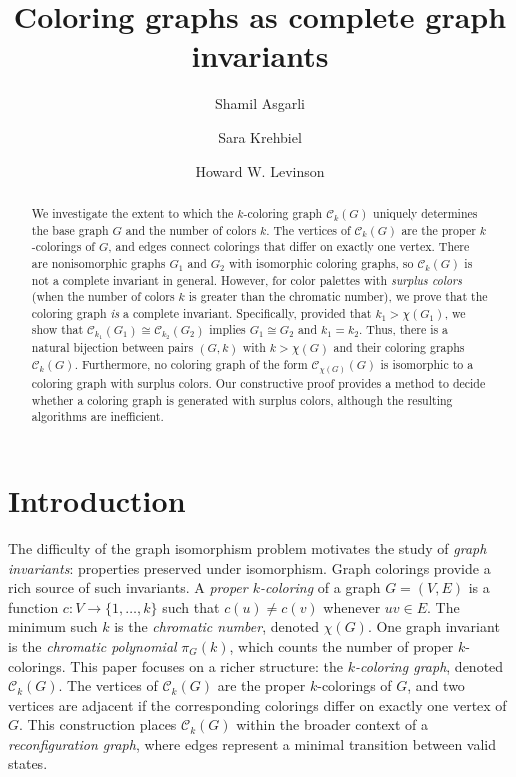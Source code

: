 \documentclass{amsart}
\title
{Coloring graphs as complete graph invariants}
\author{Shamil Asgarli}
\author{Sara Krehbiel}
\author{Howard W. Levinson}
\theoremstyle{hypothesisstyle}
\theoremstyle{definition}
\theoremstyle{remark}
\numberwithin{equation}{section}
\newcommand{\C}{\mathcal C}
\begin{document}
\begin{abstract} We investigate the extent to which the $k$-coloring graph $\mathcal{C}_{k}(G)$ uniquely determines the base graph $G$ and the number of colors $k$. The vertices of $\mathcal{C}_{k}(G)$ are the proper $k$-colorings of $G$, and edges connect colorings that differ on exactly one vertex. There are nonisomorphic graphs $G_1$ and $G_2$ with isomorphic coloring graphs, so $\mathcal{C}_{k}(G)$ is not a complete invariant in general. However, for color palettes with \emph{surplus colors} (when the number of colors $k$ is greater than the chromatic number), we prove that the coloring graph \textit{is} a complete invariant. Specifically, provided that $k_1 > \chi(G_1)$, we show that $\mathcal{C}_{k_1}(G_1)\cong \mathcal{C}_{k_2}(G_2)$ implies $G_1\cong G_2$ and $k_1=k_2$. Thus, there is a natural bijection between pairs $(G, k)$ with $k > \chi(G)$ and their coloring graphs $\mathcal{C}_k(G)$. Furthermore, no coloring graph of the form $\mathcal{C}_{\chi(G)}(G)$ is isomorphic to a coloring graph with surplus colors. Our constructive proof provides a method to decide whether a coloring graph is generated with surplus colors, although the resulting algorithms are inefficient.
\end{abstract}

\maketitle

\section{Introduction}

The difficulty of the graph isomorphism problem motivates the study of \emph{graph invariants}: properties preserved under isomorphism. Graph colorings provide a rich source of such invariants. A \emph{proper $k$-coloring} of a graph $G=(V, E)$ is a function $c\colon V \to \{1, \dots, k\}$ such that $c(u) \neq c(v)$ whenever $uv \in E$.  The minimum such $k$ is the \emph{chromatic number}, denoted $\chi(G)$. One graph invariant is the \emph{chromatic polynomial} $\pi_G(k)$, which counts the number of proper $k$-colorings. This paper focuses on a richer structure: the \emph{$k$-coloring graph}, denoted $\C_k(G)$. The vertices of $\C_k(G)$ are the proper $k$-colorings of $G$, and two vertices are adjacent if the corresponding colorings differ on exactly one vertex of $G$. This construction places $\C_k(G)$ within the broader context of a \emph{reconfiguration graph}, where edges represent a minimal transition between valid states.
\end{document}

